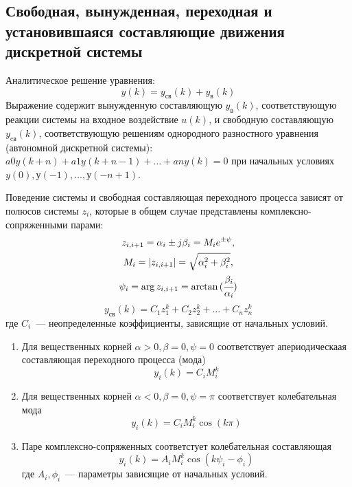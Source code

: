 \subsection{Свободная, 	вынужденная, переходная и установившаяся составляющие движения дискретной системы}
Аналитическое решение уравнения:
\begin{equation}
    y(k) = y_\text{св}(k) + y_\text{в}(k)
\end{equation}
Выражение содержит вынужденную составляющую  $y_\text{в}(k)$, соответствующую реакции системы на входное воздействие $u(k)$, и свободную составляющую $ y_\text{cв}(k)$, соответствующую решениям однородного разностного уравнения (автономной дискретной системы): $a0 y(k+n) + a1 y(k+n-1) +\dots+ an y(k) = 0$ при начальных условиях $y(0), у(-1), \dots, у(-n+1)$.

Поведение системы и свободная составляющая переходного процесса зависят от полюсов системы $z_i$, которые в общем случае представлены комплексно-сопряженными парами:
\begin{gather}
    z_{i,i+1} = \alpha_i \pm j \beta_i = M_i e^{\pm \psi},\\
    M_i = |z_{i,i+1}| = \sqrt{\alpha_i^2 + \beta_i^2}, \\
    \psi_i = \arg z_{i, i+1} = \arctan{(\cfrac{\beta_i}{\alpha_i})}
\end{gather}
\begin{equation}
    y_{\text{св}}(k) = C_1 z_1^k + C_2 z_2^k + \dots + C_n z_n^k    
\end{equation}
где $C_i$~--- неопределенные коэффициенты, зависящие от начальных условий.
\begin{enumerate}
    \item Для вещественных корней $\alpha > 0, \beta = 0, \psi = 0$ соответствует апериодическаая составляющая переходного процесса (мода)
    \begin{equation}
        y_i(k) = C_i M_i^k
    \end{equation}
    
    \item Для вещественных корней $\alpha < 0, \beta = 0, \psi = \pi$ соответствует колебательная  мода
    \begin{equation}
        y_i(k) = C_i M_i^k \cos{(k \pi)}
    \end{equation}
    
    \item Паре комплексно-сопряженных соответстует колебательная составляющая
    \begin{equation}
        y_i(k) = A_i M_i^k \cos{(k \psi_i - \phi_i)}
    \end{equation}
    где $A_i, \phi_i$~--- параметры зависящие от начальных условий.
\end{enumerate}

